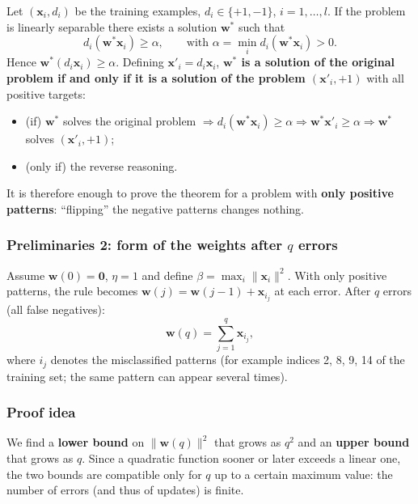 Let \((\mathbf{x}_i, d_i)\) be the training examples,
\(d_i \in \{+1, -1\}\), \(i = 1,\dots,l\). If the problem is linearly
separable there exists a solution \(\mathbf{w}^*\) such that \[
d_i(\mathbf{w}^*\mathbf{x}_i) \ge \alpha, \qquad \text{with } \alpha = \min_i d_i(\mathbf{w}^*\mathbf{x}_i) > 0.
\] Hence \(\mathbf{w}^*(d_i\mathbf{x}_i) \ge \alpha\). Defining
\(\mathbf{x}'_i = d_i\mathbf{x}_i\), \textbf{\(\mathbf{w}^*\) is a
solution of the original problem if and only if it is a solution of the
problem \((\mathbf{x}'_i, +1)\)} with all positive targets:

\begin{itemize}
\tightlist
\item
  (if) \(\mathbf{w}^*\) solves the original problem
  \(\Rightarrow d_i(\mathbf{w}^*\mathbf{x}_i) \ge \alpha \Rightarrow \mathbf{w}^*\mathbf{x}'_i \ge \alpha \Rightarrow \mathbf{w}^*\)
  solves \((\mathbf{x}'_i, +1)\);
\item
  (only if) the reverse reasoning.
\end{itemize}

It is therefore enough to prove the theorem for a problem with
\textbf{only positive patterns}: ``flipping'' the negative patterns
changes nothing.

\subsubsection{\texorpdfstring{Preliminaries 2: form of the weights
after \(q\) errors}{Preliminaries 2: form of the weights after q errors}}\label{preliminari-2-forma-dei-pesi-dopo-q-errori}

Assume \(\mathbf{w}(0) = \mathbf{0}\), \(\eta = 1\) and define
\(\beta = \max_i \|\mathbf{x}_i\|^2\). With only positive patterns, the
rule becomes \(\mathbf{w}(j) = \mathbf{w}(j-1) + \mathbf{x}_{i_j}\) at
each error. After \(q\) errors (all false negatives): \[
\mathbf{w}(q) = \sum_{j=1}^{q} \mathbf{x}_{i_j},
\] where \(i_j\) denotes the misclassified patterns (for example
indices 2, 8, 9, 14 of the training set; the same pattern can appear
several times).

\subsubsection{Proof idea}\label{idea-della-dimostrazione}

We find a \textbf{lower bound} on \(\|\mathbf{w}(q)\|^2\) that grows
as \(q^2\) and an \textbf{upper bound} that grows as \(q\). Since a
quadratic function sooner or later exceeds a linear one, the two
bounds are compatible only for \(q\) up to a certain maximum value: the
number of errors (and thus of updates) is finite.

